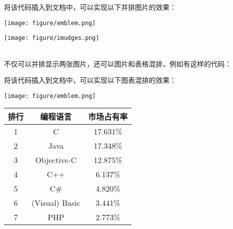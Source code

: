         将该代码插入到文档中，可以实现以下并排图片的效果：
        \\[\intextsep] 
            \begin{minipage}{0.5\textwidth} 
                \centering
                \texttt{[image: figure/emblem.png]}
                \label{fig:emblem} 
            \end{minipage}
            \begin{minipage}{0.5\textwidth} 
                \centering
                \texttt{[image: figure/imudges.png]}
                \label{fig:emblem} 
            \end{minipage}
        \\[\intextsep] 

        不仅可以并排显示两张图片，还可以图片和表格混排，例如有这样的代码：
        

        将该代码插入到文档中，可以实现以下图表混排的效果：
        \\[\intextsep] 
            \begin{minipage}{0.5\textwidth} 
                \centering
                \texttt{[image: figure/emblem.png]}
                \label{fig:emblem} 
            \end{minipage}
            \begin{minipage}{0.5\textwidth}
                \centering 
                \begin{tabular}{|c|c|c|}
                    \hline
                        排行 & 编程语言 & 市场占有率 \\
                    \hline
                        1 & C & 17.631\%    \\
                        2 & Java & 17.348\% \\
                        3 & Objective-C & 12.875\% \\
                        4 & C++ & 6.137\% \\
                        5 & C\# & 4.820\% \\
                        6 & (Visual) Basic & 3.441\% \\
                        7 & PHP & 2.773\% \\
                    \hline
                \end{tabular}
                \label{tab:presidents}
            \end{minipage}
        \\[\intextsep] 


